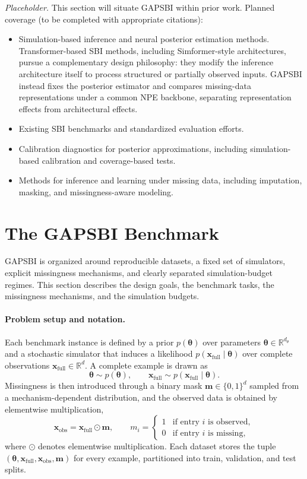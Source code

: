 \documentclass{article} %
\providecommand{\xfull}{\mathbf{x}_{\mathrm{full}}}
\providecommand{\xobs}{\mathbf{x}_{\mathrm{obs}}}
\providecommand{\mvec}{\mathbf{m}}
\providecommand{\thetab}{\boldsymbol{\theta}}
\begin{document}
\textit{Placeholder.} This section will situate GAPSBI within prior work. Planned
coverage (to be completed with appropriate citations):
\begin{itemize}
  \item Simulation-based inference and neural posterior estimation methods.
  Transformer-based SBI methods, including Simformer-style architectures, pursue
  a complementary design philosophy: they modify the inference architecture
  itself to process structured or partially observed inputs. GAPSBI instead
  fixes the posterior estimator and compares missing-data representations under a
  common NPE backbone, separating representation effects from architectural
  effects.
  \item Existing SBI benchmarks and standardized evaluation efforts.
  \item Calibration diagnostics for posterior approximations, including
  simulation-based calibration and coverage-based tests.
  \item Methods for inference and learning under missing data, including
  imputation, masking, and missingness-aware modeling.
\end{itemize}

\section{The GAPSBI Benchmark}
\label{sec:benchmark}

GAPSBI is organized around reproducible datasets, a fixed set of simulators,
explicit missingness mechanisms, and clearly separated simulation-budget regimes.
This section describes the design goals, the benchmark tasks, the missingness
mechanisms, and the simulation budgets.

\paragraph{Problem setup and notation.} Each benchmark instance is defined by a
prior $p(\thetab)$ over parameters $\thetab \in \mathbb{R}^{d_\theta}$ and a
stochastic simulator that induces a likelihood $p(\xfull \mid \thetab)$ over
complete observations $\xfull \in \mathbb{R}^{d}$. A complete example is drawn as
\begin{equation}
  \thetab \sim p(\thetab), \qquad \xfull \sim p(\xfull \mid \thetab).
  \label{eq:generative}
\end{equation}
Missingness is then introduced through a binary mask
$\mvec \in \{0,1\}^{d}$ sampled from a mechanism-dependent distribution, and the
observed data is obtained by elementwise multiplication,
\begin{equation}
  \xobs = \xfull \odot \mvec, \qquad
  m_i =
  \begin{cases}
    1 & \text{if entry $i$ is observed},\\
    0 & \text{if entry $i$ is missing},
  \end{cases}
  \label{eq:contract}
\end{equation}
where $\odot$ denotes elementwise multiplication. Each dataset stores the tuple
$(\thetab, \xfull, \xobs, \mvec)$ for every example, partitioned into train,
validation, and test splits.
\end{document}
